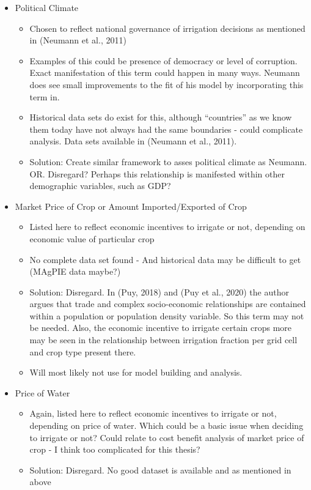 \documentclass[12pt]{extarticle}
\begin{document}
\begin{itemize}
   \item Political Climate
   \begin{itemize}
   \item Chosen to reflect national governance of irrigation decisions as mentioned in (Neumann et al., 2011) 
     \item Examples of this could be presence of democracy or level of corruption. Exact manifestation of this term could happen in many ways. Neumann does see small improvements to the fit of his model by incorporating this term in.
    \item Historical data sets do exist for this, although “countries” as we know them today have not always had the same boundaries - could complicate analysis. Data sets available in (Neumann et al., 2011).
    \item Solution: Create similar framework to asses political climate as Neumann. OR. Disregard? Perhaps this relationship is manifested within other demographic variables, such as GDP?
       \end{itemize}
     \end{itemize}   

\begin{itemize}
   \item Market Price of Crop or Amount Imported/Exported of Crop
   \begin{itemize}
   \item Listed here to reflect economic incentives to irrigate or not, depending on economic value of particular crop
     \item No complete data set found - And historical data may be difficult to get (MAgPIE data maybe?) 
     \item Solution: Disregard. In (Puy, 2018) and (Puy et al., 2020) the author argues that trade and complex socio-economic relationships are contained within a population or population density variable. So this term may not be needed. Also, the economic incentive to irrigate certain crops more may be seen in the relationship between irrigation fraction per grid cell and crop type present there. 
    \item Will most likely not use for model building and analysis.
       \end{itemize}
     \end{itemize}   
\begin{itemize}
   \item Price of Water
   \begin{itemize}
   \item Again, listed here to reflect economic incentives to irrigate or not, depending on price of water. Which could be a basic issue when deciding to irrigate or not? Could relate to cost benefit analysis of market price of crop - I think too complicated for this thesis?
    \item Solution: Disregard. No good dataset is available and as mentioned in above  
       \end{itemize}
     \end{itemize}  
\end{document}
